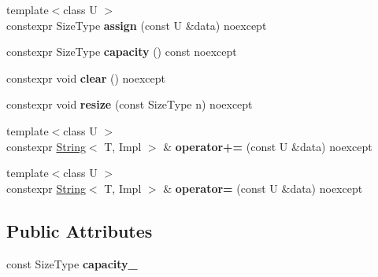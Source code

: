 \begin{DoxyCompactItemize}
{\footnotesize template$<$class U $>$ }\\constexpr Size\+Type {\bfseries assign} (const U \&data) noexcept
\item 
\mbox{\label{classbzd_1_1impl_1_1String_ae387833b6565022faa19c3cc3a4168ed}} 
constexpr Size\+Type {\bfseries capacity} () const noexcept
\item 
\mbox{\label{classbzd_1_1impl_1_1String_a374161cce72004fd645df22cd84bd50b}} 
constexpr void {\bfseries clear} () noexcept
\item 
\mbox{\label{classbzd_1_1impl_1_1String_a569774da00ee68fe18eebcd4e2e877c7}} 
constexpr void {\bfseries resize} (const Size\+Type n) noexcept
\item 
\mbox{\label{classbzd_1_1impl_1_1String_a3c1152b72e84e60db2f74f519316e277}} 
{\footnotesize template$<$class U $>$ }\\constexpr \hyperlink{classbzd_1_1impl_1_1String}{String}$<$ T, Impl $>$ \& {\bfseries operator+=} (const U \&data) noexcept
\item 
\mbox{\label{classbzd_1_1impl_1_1String_a4fa1168443d81560da18876d2f18f713}} 
{\footnotesize template$<$class U $>$ }\\constexpr \hyperlink{classbzd_1_1impl_1_1String}{String}$<$ T, Impl $>$ \& {\bfseries operator=} (const U \&data) noexcept
\end{DoxyCompactItemize}
\subsection*{Public Attributes}
\begin{DoxyCompactItemize}
\item 
\mbox{\label{classbzd_1_1impl_1_1String_a5a0745223c7a00f9578619da04877f0c}} 
const Size\+Type {\bfseries capacity\+\_\+}
\end{DoxyCompactItemize}
